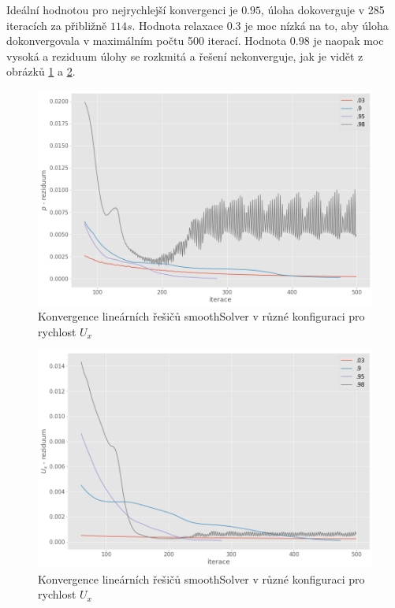 \documentclass[a4paper,12pt]{report}
\theoremstyle{remark}
\begin{document}
Ideální hodnotou pro nejrychlejší konvergenci je $0.95$, úloha dokoverguje v 285 iteracích za přibližně $114s$. Hodnota relaxace $0.3$ je moc nízká na to, aby úloha dokonvergovala v maximálním počtu 500 iterací.  Hodnota $0.98$ je naopak moc vysoká a reziduum úlohy se rozkmitá a řešení nekonverguje, jak je vidět z obrázků \ref{fig:p-residuum-relax} a \ref{fig:ux-residuum-relax}.

\begin{figure}[H]
	\centering
	\includegraphics[width=1\linewidth]{p-under-relax.png}
	\caption{Konvergence lineárních řešičů smoothSolver v různé konfiguraci pro rychlost $U_x$}
	\label{fig:p-residuum-relax}
\end{figure}

\begin{figure}[H]
	\centering
	\includegraphics[width=1\linewidth]{ux-under-relax.png}
	\caption{Konvergence lineárních řešičů smoothSolver v různé konfiguraci pro rychlost $U_x$}
	\label{fig:ux-residuum-relax}
\end{figure}
\end{document}
